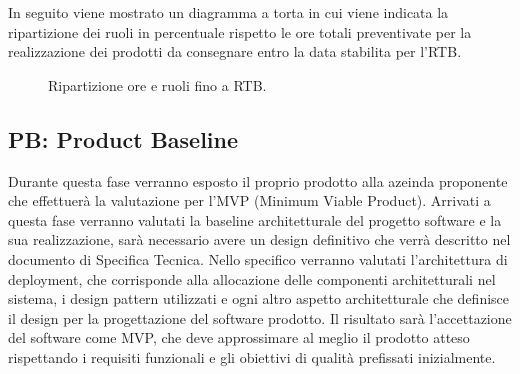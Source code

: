\begin{table}[!h]
    \centering
    \caption{Ripartizione ore e costi fino RTB.}
    \label{tab:stima_costi_RTB} 
\end{table}

In seguito viene mostrato un diagramma a torta in cui viene indicata la ripartizione dei ruoli in percentuale rispetto le ore totali preventivate per la realizzazione dei prodotti da consegnare entro la data stabilita per l'RTB.

\begin{figure}[!h]
    \centering
    \caption{Ripartizione ore e ruoli fino a RTB.}
    \label{fig:pie_ruoli_RTB}
\end{figure}

\subsection{PB: Product Baseline}
Durante questa fase verranno esposto il proprio prodotto alla azeinda proponente che effettuerà la valutazione per l'MVP (Minimum Viable Product).
Arrivati a questa fase verranno valutati la baseline architetturale del progetto software e la sua realizzazione, sarà necessario avere un design definitivo 
che verrà descritto nel documento di Specifica Tecnica.
Nello specifico verranno valutati l'architettura di deployment, che corrisponde alla allocazione delle componenti architetturali nel sistema, 
i design pattern utilizzati e ogni altro aspetto architetturale che definisce il design per la progettazione del software prodotto.
Il risultato sarà l'accettazione del software come MVP, che deve approssimare al meglio il prodotto atteso rispettando i requisiti funzionali 
e gli obiettivi di qualità prefissati inizialmente.